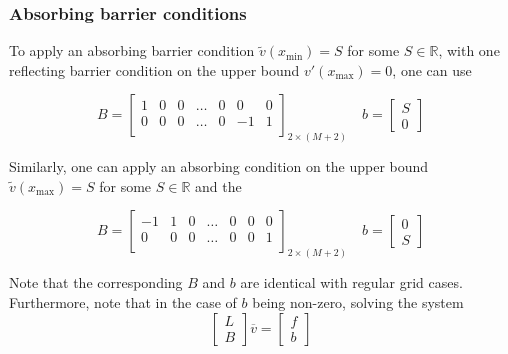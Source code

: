 \documentclass[11pt]{article}
\theoremstyle{definition}
\begin{document}
\subsubsection{Absorbing barrier conditions}\label{subsubsec:absorbing-barrier-conditions-irregular}

To apply an absorbing barrier condition $\tilde{v}(x_{\min}) =S$ for some $S \in \mathbb{R}$, with one reflecting barrier condition on the upper bound $v'(x_{\max}) = 0$, one can use

\begin{equation}\label{eq:absorbing-barrier-matrix}
B = \begin{bmatrix}
1 & 0 & 0 & \dots & 0 & 0 & 0 \\
0 & 0 & 0 & \dots & 0 & -1 & 1\\
\end{bmatrix}_{2 \times (M+2)} \quad
b = \begin{bmatrix}
S \\
0
\end{bmatrix}
\end{equation}

Similarly, one can apply an absorbing condition on the upper bound  $\tilde{v}(x_{\max}) =S$ for some $S \in \mathbb{R}$ and the


\begin{equation}\label{eq:absorbing-barrier-matrix-ub}
B = \begin{bmatrix}
-1 & 1 & 0 & \dots & 0 & 0 & 0 \\
0 & 0 & 0 & \dots & 0 & 0 & 1\\
\end{bmatrix}_{2 \times (M+2)} \quad
b = \begin{bmatrix}
0 \\
S
\end{bmatrix}
\end{equation}

Note that the corresponding $B$ and $b$ are identical with regular grid cases. Furthermore, note that in the case of $b$ being non-zero, solving the system 
\begin{equation}
\begin{bmatrix}
 L \\
 B
\end{bmatrix} 
\overline{v}
=
\begin{bmatrix}
f \\
b
\end{bmatrix}
\end{equation}
\end{document}
